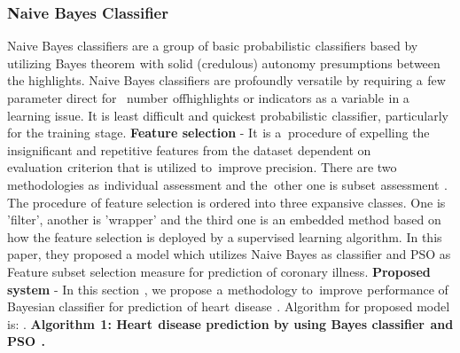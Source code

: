 \documentclass[oneside,12pt]{Classes/VTU}
\begin{document}
    \subsubsection{Naive Bayes Classifier}
    Naive Bayes classifiers are a group of basic probabilistic\tiny\textcolor{white}{s}\normalsize classifiers based by utilizing Bayes theorem\tiny\textcolor{white}{s}\normalsize with solid (credulous) autonomy presumptions between the highlights. Naive Bayes classifiers are profoundly versatile by requiring a\tiny\textcolor{white}{s}\normalsize few parameter direct for\tiny\textcolor{white}{m}\normalsize number\tiny\textcolor{white}{s}\normalsize of\tiny\textcolor{white}{f}\normalsize highlights or indicators as a variable\tiny\textcolor{white}{s}\normalsize in a learning issue. It is least difficult and quickest probabilistic\tiny\textcolor{white}{s}\normalsize classifier, particularly for the training\tiny\textcolor{white}{s}\normalsize stage.    
    \linebreak
    \linebreak                
    \textbf{Feature selection} - It\tiny\textcolor{white}{s}\normalsize is a\tiny\textcolor{white}{n}\normalsize procedure of expelling the insignificant and repetitive features from the dataset\tiny\textcolor{white}{s}\normalsize dependent on evaluation\tiny\textcolor{white}{s}\normalsize criterion that is utilized to\tiny\textcolor{white}{o}\normalsize improve precision. There are two methodologies as\tiny\textcolor{white}{s}\normalsize individual\tiny\textcolor{white}{s}\normalsize assessment and the\tiny\textcolor{white}{n}\normalsize other one is subset\tiny\textcolor{white}{s}\normalsize assessment\tiny\textcolor{white}{s}\normalsize. The procedure\tiny\textcolor{white}{s}\normalsize of feature selection is ordered into three expansive classes. One is 'filter', another is 'wrapper' and the third one is an embedded method based on how the feature selection is deployed by a supervised learning algorithm. In this paper, they proposed a model which utilizes Naive Bayes as classifier and PSO as Feature subset selection measure for prediction of coronary illness.
    \linebreak
    \linebreak                
    \textbf{Proposed system} - In this section\tiny\textcolor{white}{s}\normalsize, we propose\tiny\textcolor{white}{s}\normalsize a\tiny\textcolor{white}{s}\normalsize methodology to\tiny\textcolor{white}{o}\normalsize improve\tiny\textcolor{white}{s}\normalsize performance of Bayesian classifier for prediction\tiny\textcolor{white}{s}\normalsize of heart\tiny\textcolor{white}{s}\normalsize disease\tiny\textcolor{white}{s}\normalsize. Algorithm\tiny\textcolor{white}{s}\normalsize for proposed model is:                    .
    \linebreak
    \linebreak
    \textbf{Algorithm\tiny\textcolor{white}{s}\normalsize 1: Heart\tiny\textcolor{white}{s}\normalsize disease prediction by using Bayes classifier\tiny\textcolor{white}{s}\normalsize and PSO\tiny\textcolor{white}{s}\normalsize.}
    
\end{document}
